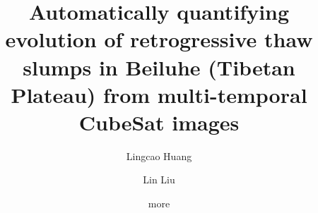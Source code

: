 \documentclass[authoryear,preprint,review,12pt]{elsarticle}
\begin{document}
\begin{frontmatter}




\title{Automatically quantifying evolution of retrogressive thaw slumps in Beiluhe (Tibetan Plateau) from multi-temporal CubeSat images}



\author[a]{Lingcao Huang}
\author[a]{Lin Liu}
\author[b]{more}



\address[a]{Earth System Science Programme, Faculty of Science, The Chinese University of Hong Kong, Hong Kong SAR, China.}
\address[b]{Add a few more co-authors?}

\begin{abstract}


\end{abstract}
\end{frontmatter}
\end{document}
